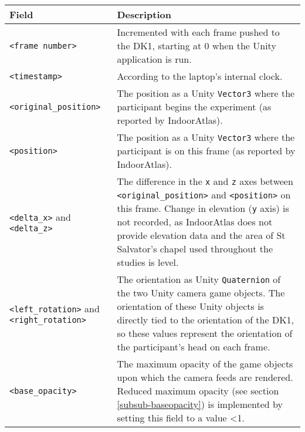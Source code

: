 \begin{center}
\begin{longtable}{ l  p{6.5cm} }

\toprule

\textbf{Field} & \textbf{Description} \\

\midrule

\texttt{<frame number>} & Incremented with each frame pushed to the DK1, starting at 0 when the Unity application is run. \\

\midrule

\texttt{<timestamp>} & According to the laptop's internal clock. \\

\midrule

\texttt{<original\_position>} & The position as a Unity \texttt{Vector3} where the participant begins the experiment (as reported by IndoorAtlas). \\

\midrule

\texttt{<position>} & The position as a Unity \texttt{Vector3} where the participant is on this frame (as reported by IndoorAtlas). \\

\midrule

\texttt{<delta\_x>} and \texttt{<delta\_z>} & The difference in the \texttt{x} and \texttt{z} axes between \texttt{<original\_position>} and \texttt{<position>} on this frame. Change in elevation (\texttt{y} axis) is not recorded, as IndoorAtlas does not provide elevation data and the area of St Salvator's chapel used throughout the studies is level. \\

\midrule

\texttt{<left\_rotation>} and \texttt{<right\_rotation>} & The orientation as Unity \texttt{Quaternion} of the two Unity camera game objects. The orientation of these Unity objects is directly tied to the orientation of the DK1, so these values represent the orientation of the participant's head on each frame. \\

\midrule

\texttt{<base\_opacity>} & The maximum opacity of the game objects upon which the camera feeds are rendered. Reduced maximum opacity (see section \ref{subsub-baseopacity}) is implemented by setting this field to a value \textless 1. \\


\end{longtable}
\end{center}
